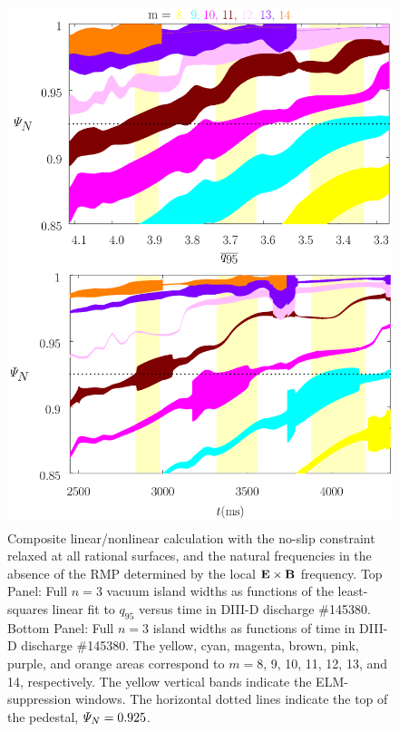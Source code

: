 \documentclass[12pt,prb,aps]{revtex4-1}
\begin{document}
\begin{figure}
\includegraphics[height=6in]{fig5.pdf}
\caption{Composite linear/nonlinear calculation with the no-slip constraint relaxed at all rational surfaces, and the natural frequencies
in the absence of the RMP determined by the local  ${\bf E}\times {\bf B}$
frequency. Top Panel: Full  $n=3$ vacuum island widths as functions of the least-squares linear fit to $q_{95}$ versus time 
in   DIII-D discharge \#145380.
Bottom Panel:  Full $n=3$ island widths as functions of time
in   DIII-D discharge \#145380. The yellow, cyan, magenta, brown, pink,
purple, and orange  areas correspond to $m=8$, 9, 10, 11, 12, 13, and 14, respectively. The yellow vertical bands indicate the ELM-suppression windows. 
The horizontal dotted lines indicate the top of the pedestal, ${\mit\Psi}_N=0.925$.} \label{fig5}
\end{figure}
\end{document}
